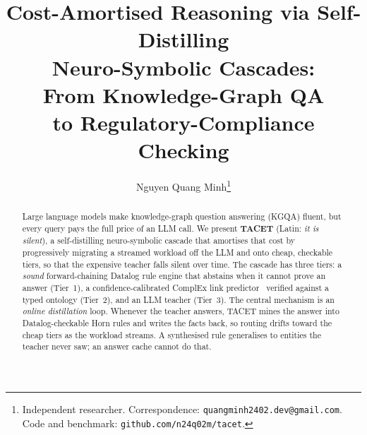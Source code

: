 \documentclass[11pt]{article}
\title{\textbf{Cost-Amortised Reasoning via Self-Distilling\\
Neuro-Symbolic Cascades:\\
From Knowledge-Graph QA\\
to Regulatory-Compliance Checking}}
\author{Nguyen Quang Minh\thanks{Independent researcher. Correspondence:
\texttt{quangminh2402.dev@gmail.com}. Code and benchmark:
\texttt{github.com/n24q02m/tacet}.}}
\date{}
\theoremstyle{plain}
\begin{document}
\maketitle

\begin{abstract}
Large language models make knowledge-graph question answering (KGQA)
fluent, but every query pays the full price of an LLM call. We present
\textbf{TACET} (Latin: \emph{it is silent}), a self-distilling
neuro-symbolic cascade that amortises that cost by progressively migrating
a streamed workload off the LLM and onto cheap, checkable tiers, so that
the expensive teacher falls silent over time. The cascade has three tiers:
a \emph{sound} forward-chaining Datalog rule engine that abstains when it
cannot prove an answer (Tier~1), a confidence-calibrated ComplEx link
predictor~\citep{trouillon2016complex,guo2017calibration} verified against
a typed ontology (Tier~2), and an LLM teacher (Tier~3). The central
mechanism is an \emph{online distillation} loop. Whenever the teacher
answers, TACET mines the answer into Datalog-checkable Horn rules and
writes the facts back, so routing drifts toward the cheap tiers as the
workload streams. A synthesised rule generalises to entities the teacher
never saw; an answer cache cannot do that.


\end{abstract}
\end{document}
